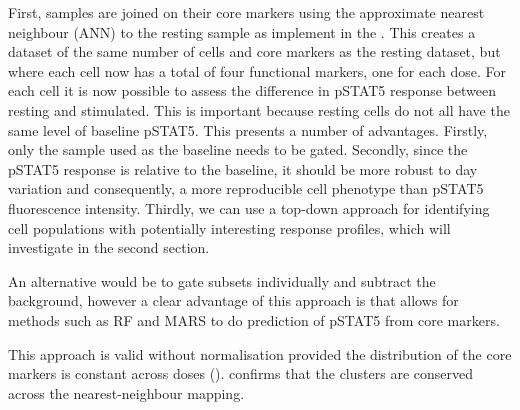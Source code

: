 First, samples are joined on their core markers using the approximate nearest neighbour (ANN) to the resting sample \citep{Jones:2011ez}
as implement in the .
This creates a dataset of the same number of cells and core markers as the resting dataset, but where each cell now has a total of four functional markers,
one for each dose.
For each cell it is now possible to assess the difference in pSTAT5 response between resting and stimulated.
This is important because resting cells do not all have the same level of baseline pSTAT5.
This presents a number of advantages.
Firstly, only the sample used as the baseline needs to be gated.
Secondly, since the pSTAT5 response is relative to the baseline, it should be more robust to day variation and consequently,
a more reproducible cell phenotype than pSTAT5 fluorescence intensity.
Thirdly, we can use a top-down approach for identifying cell populations with potentially interesting response profiles, which
will investigate in the second section.

An alternative would be to gate subsets individually and subtract the background, however a clear advantage of this approach is that
allows for methods such as RF and MARS to do prediction of pSTAT5 from core markers.

This approach is valid without normalisation provided the distribution of the core markers is constant across doses ().
 confirms that the clusters are conserved across the nearest-neighbour mapping.


